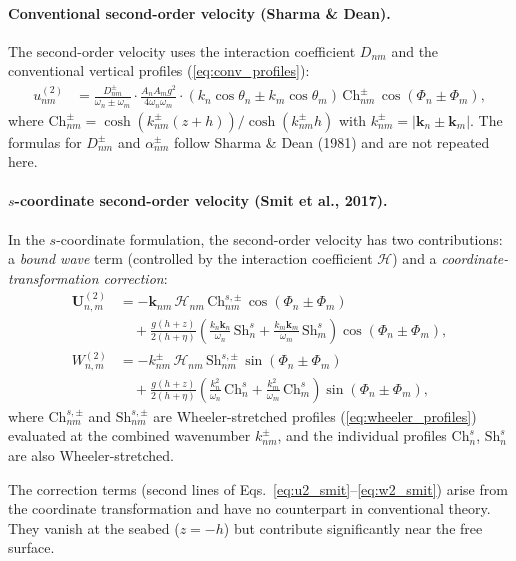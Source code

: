 \paragraph{Conventional second-order velocity (Sharma \& Dean).}
The second-order velocity uses the interaction coefficient $D_{nm}$ and the conventional vertical profiles (\ref{eq:conv_profiles}):
\begin{align}
    u_{nm}^{(2)} &= \frac{D_{nm}^\pm}{\omega_n \pm \omega_m}\cdot\frac{A_n A_m g^2}{4\omega_n \omega_m} \cdot (k_n\cos\theta_n \pm k_m\cos\theta_m)\, \mathrm{Ch}_{nm}^\pm\, \cos(\Phi_n \pm \Phi_m),
\end{align}
where $\mathrm{Ch}_{nm}^\pm = \cosh(k_{nm}^\pm(z+h))/\cosh(k_{nm}^\pm h)$ with $k_{nm}^\pm = |\mathbf{k}_n \pm \mathbf{k}_m|$. The formulas for $D_{nm}^\pm$ and $\alpha_{nm}^\pm$ follow Sharma \& Dean (1981) and are not repeated here.

\paragraph{$s$-coordinate second-order velocity (Smit et al., 2017).}
In the $s$-coordinate formulation, the second-order velocity has two contributions: a \emph{bound wave} term (controlled by the interaction coefficient $\mathscr{H}$) and a \emph{coordinate-transformation correction}:
\begin{align}
    \mathbf{U}_{n,m}^{(2)} &= -\mathbf{k}_{nm}\, \mathscr{H}_{nm}\, \mathrm{Ch}_{nm}^{s,\pm}\, \cos(\Phi_n \pm \Phi_m) \nonumber \\
    &\quad + \frac{g(h+z)}{2(h+\eta)} \left(\frac{k_n \mathbf{k}_n}{\omega_n}\,\mathrm{Sh}_n^s + \frac{k_m \mathbf{k}_m}{\omega_m}\,\mathrm{Sh}_m^s\right) \cos(\Phi_n \pm \Phi_m), \label{eq:u2_smit}\\[6pt]
    W_{n,m}^{(2)} &= -k_{nm}^\pm\, \mathscr{H}_{nm}\, \mathrm{Sh}_{nm}^{s,\pm}\, \sin(\Phi_n \pm \Phi_m) \nonumber \\
    &\quad + \frac{g(h+z)}{2(h+\eta)} \left(\frac{k_n^2}{\omega_n}\,\mathrm{Ch}_n^s + \frac{k_m^2}{\omega_m}\,\mathrm{Ch}_m^s\right) \sin(\Phi_n \pm \Phi_m), \label{eq:w2_smit}
\end{align}
where $\mathrm{Ch}_{nm}^{s,\pm}$ and $\mathrm{Sh}_{nm}^{s,\pm}$ are Wheeler-stretched profiles (\ref{eq:wheeler_profiles}) evaluated at the combined wavenumber $k_{nm}^\pm$, and the individual profiles $\mathrm{Ch}_n^s$, $\mathrm{Sh}_n^s$ are also Wheeler-stretched.

The correction terms (second lines of Eqs.~\ref{eq:u2_smit}--\ref{eq:w2_smit}) arise from the coordinate transformation and have no counterpart in conventional theory. They vanish at the seabed ($z = -h$) but contribute significantly near the free surface.

